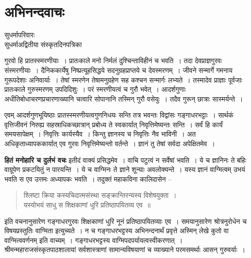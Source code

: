 {\fontsize{16}{18}\selectfont
\presetvalues
\chapter{अभिनन्दवाचः}

\begin{center}
\smallskip
सुधर्मापरिवारः\\
सुधर्मा\enginline{-}अद्वितीया संस्कृतदिनपत्रिका \\

\addrule
\end{center}

गुरवो हि प्रातस्स्मरणीयाः~। प्रातःकाले मनो निर्मलं दुश्चिन्ताविहीनं च भवति~। तदा देवप्राज्ञगुरवः संस्मरणीयाः~। दैनिककार्येषु निष्प्रत्यूहसिद्धये सदनुग्रहप्राप्तये च देवस्मरणम्~। जीवने सन्मार्गे गमनाय गुरूपदेशाः अनिवार्याः~। तेषां स्मरणेन तेषामनुग्रहेण सह कश्चन सन्मार्गः लभ्यते~। तस्मादेव प्राज्ञाः पूर्वजाः प्रातःकाले गुरुस्मरणम् उपदिदिशुः~। परं स्मरणीयत्वं च गुरौ भवेत्~। आदर्शगुणाः अधीतिबोधाचरणप्रचारणाख्यानि चत्वारि सोपानानि तस्मिन् गुरौ वसेयुः~। तदैव गुरून् छात्राः सास्मर्यन्ते~। 

एवम् आदर्शगुणभूयिष्ठाः प्रातस्स्मरणीयत्वगुणनिधयः सन्ति तत्र भवन्तः विद्वांसः गङ्गाधरभट्टाः~। सार्थकं वृत्तिजीवनं निरुह्य सहस्राधिकच्छात्रान् प्रबोध्य ते स्वकार्यात् निवृत्तिमेष्यन्तः सन्ति~। सर्वं हि कार्यं समयसापेक्षम्~। निवृत्तिः कार्यस्यैव~। किन्तु ज्ञानस्य च निवृत्तिः नैव भाविनी~। अत अधिकृताध्यापककार्यात् एव गुरवः निवृत्तिमेष्यन्तो वर्तन्ते~। ज्ञानं तु तेषां सर्वदा अपेक्षितमेव~।

\textbf{हितं मनोहारि च दुर्लभं वचः} इतीदं वाक्यं प्रसिद्धमेव~। वाचि पटुत्वं न सर्वेषां भवति~। ये च ज्ञानिनः ते बहिः वाग्रूपेण प्रकटयितुं न पारयन्ति~। ये च वाग्मिनः ते ज्ञाने शून्याः अवलोक्यन्ते~। यस्य ज्ञानं वाग्मित्वम् उभयं भवति स एव उत्तमः अध्यापकः भवति~। तदुक्तं महाकविना कालिदासेन --

\begin{verse}
श्लिष्टा क्रिया कस्यचिदात्मसंस्था सङ्क्रान्तिरन्यस्य विशेषयुक्ता~।\\
यस्योभयं साधु स शिक्षकाणां धुरि प्रतिष्ठापयितव्य एव~॥
\end{verse}

इति वचनानुसारेण गङ्गाधरगुरवः शिक्षकाणां धुरि नूनं प्रतिष्ठापयितव्याः एव~। समयानुसारेण श्रोत्रनुरोधेन च विषयप्रस्तुतिः वाग्मिता इत्युच्यते~। न च गङ्गाधरभट्टस्य अभिनन्दनार्थं प्रवृत्ते अस्मिन् लेखे कुतो वा वाग्मित्ववर्णनम् इति वाच्यम्~। गङ्गाधरभट्टस्य वाग्मिपदपर्यायत्वस्वीकरणात्~। श्रीमन्महाराजसंस्कृतपाठशालायां सर्वशास्त्राणां सामान्यविषयाणां च व्याख्याने परमसमर्थाः आसन् गुरुवर्याः~। 

}
